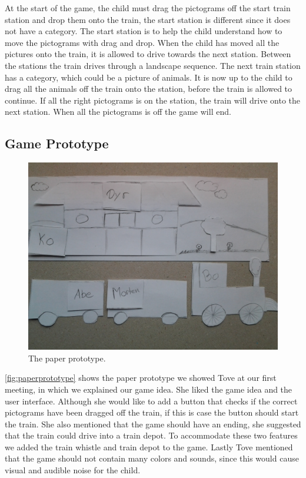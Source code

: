 At the start of the game, the child must drag the pictograms off the start train station and drop them onto the train, the start station is different since it does not have a category. The start station is to help the child understand how to move the pictograms with drag and drop. When the child has moved all the pictures onto the train, it is allowed to drive towards the next station. Between the stations the train drives through a landscape sequence. The next train station has a category, which could be a picture of animals. It is now up to the child to drag all the animals off the train onto the station, before the train is allowed to continue. If all the right pictograms is on the station, the train will drive onto the next station. When all the pictograms is off the game will end.

\subsection{Game Prototype}
\begin{figure}[H]
\centering
\includegraphics[width=0.9\linewidth]{img/screenshots/prototype1.jpg}
\caption{The paper prototype.}
\label{fig:paperprototype}
\end{figure}
\autoref{fig:paperprototype} shows the paper prototype we showed Tove at our first meeting, in which we explained our game idea. She liked the game idea and the user interface. Although she would like to add a button that checks if the correct pictograms have been dragged off the train, if this is case the button should start the train. She also mentioned that the game should have an ending, she suggested that the train could drive into a train depot. To accommodate these two features we added the train whistle and train depot to the game. 
Lastly Tove mentioned that the game should not contain many colors and sounds, since this would cause visual and audible noise for the child. 


